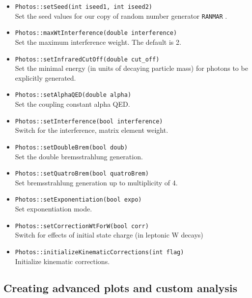 \documentclass[]{Photos_interface_design}
\begin{document}
\begin{itemize}
  \item {\tt Photos::setSeed(int iseed1, int iseed2)} \\
        Set the  seed values for our copy of random number generator {\tt RANMAR} \cite{James:1988vf,marsaglia:1987}.
  \item {\tt Photos::maxWtInterference(double interference)} \\
        Set the maximum interference weight. The default is 2.
  \item {\tt Photos::setInfraredCutOff(double cut\_off)} \\
        Set the minimal energy (in units of decaying particle mass)
        for photons to be explicitly generated.
  \item {\tt Photos::setAlphaQED(double alpha)} \\
        Set the coupling constant alpha QED.
  \item {\tt Photos::setInterference(bool interference)} \\
        Switch for the interference, matrix element weight.
  \item {\tt Photos::setDoubleBrem(bool doub)} \\
        Set the double bremsstrahlung generation.
  \item {\tt Photos::setQuatroBrem(bool quatroBrem)} \\
        Set bremsstrahlung generation up to multiplicity of 4.
  \item {\tt Photos::setExponentiation(bool expo)} \\
        Set exponentiation mode.
  \item {\tt Photos::setCorrectionWtForW(bool corr)} \\
        Switch for effects of initial state charge (in leptonic W decays)
  \item {\tt Photos::initializeKinematicCorrections(int flag)} \\
        Initialize kinematic corrections.
\end{itemize}

\subsection{Creating advanced plots and custom analysis}
\label{App:Plots}

\end{document}
